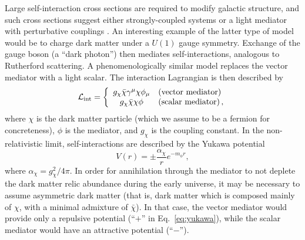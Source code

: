 Large self-interaction cross sections are required to modify galactic structure, and such cross sections suggest either strongly-coupled systems \citep[\eg,][]{Frandsen:2011kt,Hochberg:2014dra,Hochberg:2014kqa} or a light mediator with perturbative couplings \citep[\eg,][]{Feng:2009mn,Ackerman:2008gi,Kaplan:2009de,Feng:2009hw,Buckley:2009in,Loeb:2010gj,Tulin:2012wi,Tulin:2013teo,Schutz:2014nka,Blennow:2016gde}. An interesting example of the latter type of model would be to charge dark matter under a $U(1)$ gauge symmetry. %
Exchange of the gauge boson (a ``dark photon'') then mediates self-interactions, analogous to Rutherford scattering. A phenomenologically similar model replaces the vector mediator with a light scalar. The interaction Lagrangian is then described by %
\begin{equation}
\label{eq:sidm}
{\cal L_{\rm int}}=\bigg\{
\begin{array}{c l}
g_\chi\bar{\chi}\gamma^\mu\chi\phi_\mu & \text{(vector mediator)}\\
g_\chi\bar{\chi}\chi\phi & \text{(scalar mediator)} \, ,
\end{array}
\end{equation}
where $\chi$ is the dark matter particle (which we assume to be a fermion for concreteness), $\phi$ is the mediator, and $g_\chi$ is the coupling constant. In the non-relativistic limit, self-interactions are described by the Yukawa potential
\begin{equation}
V(r)=\pm\frac{\alpha_\chi}{r}e^{-m_\phi r},
\label{eq:yukawa}
\end{equation}
where $\alpha_\chi = g_\chi^2/4\pi$. In order for annihilation through the mediator to not deplete the dark matter relic abundance during the early universe, it may be necessary to assume asymmetric dark matter (that is, dark matter which is composed mainly of $\chi$, with a minimal admixture of $\bar\chi$). In that case, the vector mediator would provide only a repulsive potential (``$+$'' in Eq.~\ref{eq:yukawa}), while the scalar mediator would have an attractive potential (``$-$'').


